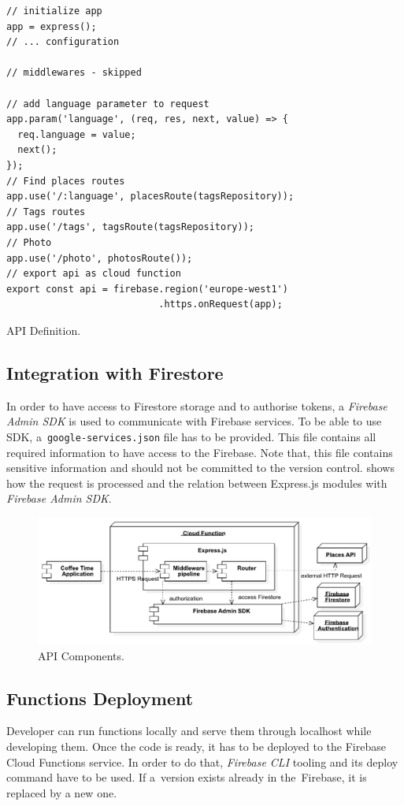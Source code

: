\begin{listing}[ht]
\begin{verbatim}
// initialize app
app = express();
// ... configuration

// middlewares - skipped

// add language parameter to request
app.param('language', (req, res, next, value) => {
  req.language = value;
  next();
});
// Find places routes
app.use('/:language', placesRoute(tagsRepository));
// Tags routes
app.use('/tags', tagsRoute(tagsRepository));
// Photo
app.use('/photo', photosRoute());
// export api as cloud function
export const api = firebase.region('europe-west1')
                           .https.onRequest(app);
\end{verbatim}
\caption{API Definition.}
\label{listing:cta-index}
\end{listing}

\subsection{Integration with Firestore}
In order to have access to Firestore storage and to authorise tokens, a \textit{Firebase Admin SDK} is used to communicate with Firebase services. To be able to use SDK, a~\verb|google-services.json| file has to be provided. This file contains all required information to have access to the Firebase. Note that, this file contains sensitive information and should not be committed to the version control.  shows how the request is processed and the relation between Express.js modules with \textit{Firebase Admin SDK}.

\begin{figure}[ht]
    \centering
    \includegraphics[width=\linewidth]{img/implementation/coffee-api-components.pdf}
    \caption{API Components.}
    \label{fig:cta-relations}
\end{figure}

\subsection{Functions Deployment}
Developer can run functions locally and serve them through localhost while developing them. Once the code is ready, it has to be deployed to the Firebase Cloud Functions service. In order to do that, \textit{Firebase CLI} tooling and its deploy command have to be used. If a~version exists already in the~Firebase, it is replaced by a new one.

